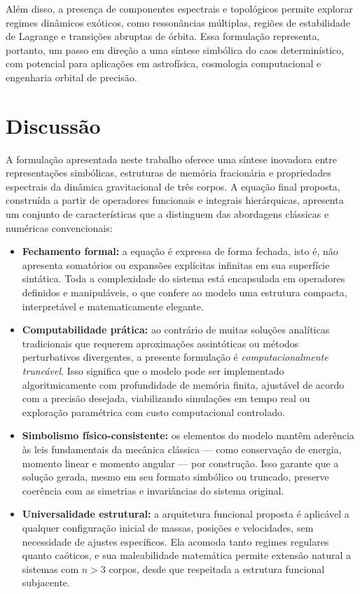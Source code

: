 \documentclass[12pt]{article}
\begin{document}
Além disso, a presença de componentes espectrais e topológicos permite explorar regimes dinâmicos exóticos, como ressonâncias múltiplas, regiões de estabilidade de Lagrange e transições abruptas de órbita. Essa formulação representa, portanto, um passo em direção a uma síntese simbólica do caos determinístico, com potencial para aplicações em astrofísica, cosmologia computacional e engenharia orbital de precisão.


\section{Discussão}

A formulação apresentada neste trabalho oferece uma síntese inovadora entre representações simbólicas, estruturas de memória fracionária e propriedades espectrais da dinâmica gravitacional de três corpos. A equação final proposta, construída a partir de operadores funcionais e integrais hierárquicas, apresenta um conjunto de características que a distinguem das abordagens clássicas e numéricas convencionais:

\begin{itemize}
    \item \textbf{Fechamento formal:} a equação é expressa de forma fechada, isto é, não apresenta somatórios ou expansões explícitas infinitas em sua superfície sintática. Toda a complexidade do sistema está encapsulada em operadores definidos e manipuláveis, o que confere ao modelo uma estrutura compacta, interpretável e matematicamente elegante.

    \item \textbf{Computabilidade prática:} ao contrário de muitas soluções analíticas tradicionais que requerem aproximações assintóticas ou métodos perturbativos divergentes, a presente formulação é \textit{computacionalmente truncável}. Isso significa que o modelo pode ser implementado algoritmicamente com profundidade de memória finita, ajustável de acordo com a precisão desejada, viabilizando simulações em tempo real ou exploração paramétrica com custo computacional controlado.

    \item \textbf{Simbolismo físico-consistente:} os elementos do modelo mantêm aderência às leis fundamentais da mecânica clássica — como conservação de energia, momento linear e momento angular — por construção. Isso garante que a solução gerada, mesmo em seu formato simbólico ou truncado, preserve coerência com as simetrias e invariâncias do sistema original.

    \item \textbf{Universalidade estrutural:} a arquitetura funcional proposta é aplicável a qualquer configuração inicial de massas, posições e velocidades, sem necessidade de ajustes específicos. Ela acomoda tanto regimes regulares quanto caóticos, e sua maleabilidade matemática permite extensão natural a sistemas com \( n > 3 \) corpos, desde que respeitada a estrutura funcional subjacente.
\end{itemize}
\end{document}
